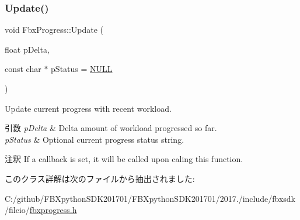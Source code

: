 \subsubsection{\texorpdfstring{Update()}{Update()}}
{\footnotesize\ttfamily void Fbx\+Progress\+::\+Update (\begin{DoxyParamCaption}\item[{float}]{p\+Delta,  }\item[{const char $\ast$}]{p\+Status = {\ttfamily \hyperlink{fbxarch_8h_a070d2ce7b6bb7e5c05602aa8c308d0c4}{N\+U\+LL}} }\end{DoxyParamCaption})}

Update current progress with recent workload. 
\begin{DoxyParams}{引数}
{\em p\+Delta} & Delta amount of workload progressed so far. \\
\hline
{\em p\+Status} & Optional current progress status string. \\
\hline
\end{DoxyParams}
\begin{DoxyRemark}{注釈}
If a callback is set, it will be called upon caling this function. 
\end{DoxyRemark}


このクラス詳解は次のファイルから抽出されました\+:\begin{DoxyCompactItemize}
\item 
C\+:/github/\+F\+B\+Xpython\+S\+D\+K201701/\+F\+B\+Xpython\+S\+D\+K201701/2017./include/fbxsdk/fileio/\hyperlink{fbxprogress_8h}{fbxprogress.\+h}\end{DoxyCompactItemize}
